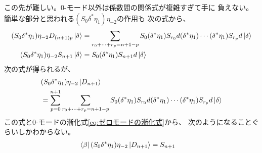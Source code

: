 {	\begin{todo}[ここまで]\label{todo:ここまで} %
		この先が難しい。$0$-モード以外は係数間の関係式が複雑すぎて手に
		負えない。簡単な部分と思われる$(S_0\delta^*\eta_1)\eta_{-2}$の作用も
		次の式から、
		\begin{equation*}\begin{split}
			(S_0\delta^*\eta_1)\eta_{-2}D_{(n+1)p}\mathinner{|{\delta}\rangle}
			&= \sum_{r_0+\cdots+r_p=n+1-p}
				S_0(\delta^*\eta_1)S_{r_0}d(\delta^*\eta_1)
				\cdots(\delta^*\eta_1)S_{r_p}d\mathinner{|{\delta}\rangle} \\
			(S_0\delta^*\eta_1)\eta_{-2}S_{n+1}\mathinner{|{\delta}\rangle}
			&= S_0(\delta^*\eta_1)S_{n+1}d\mathinner{|{\delta}\rangle} \\
		\end{split}\end{equation*}
		次の式が得られるが、
		\begin{equation*}\begin{split}
			&(S_0\delta^*\eta_1)\eta_{-2}\mathinner{|{D_{n+1}}\rangle} \\
			&= \sum_{p=0}^{n+1}\sum_{r_0+\cdots+r_p=n+1-p}
				S_0(\delta^*\eta_1)S_{r_0}d(\delta^*\eta_1)
				\cdots(\delta^*\eta_1)S_{r_p}d\mathinner{|{\delta}\rangle}
		\end{split}\end{equation*}
		この式と$0$-モードの漸化式\eqref{eq:ゼロモードの漸化式}から、
		次のようになることぐらいしかわからない。
		\begin{equation*}\begin{split}
			\mathinner{\langle{\beta}|}(S_0\delta^*\eta_1)\eta_{-2}\mathinner{|{D_{n+1}}\rangle} &= S_{n+1}
		\end{split}\end{equation*}
	\end{todo} %
}
